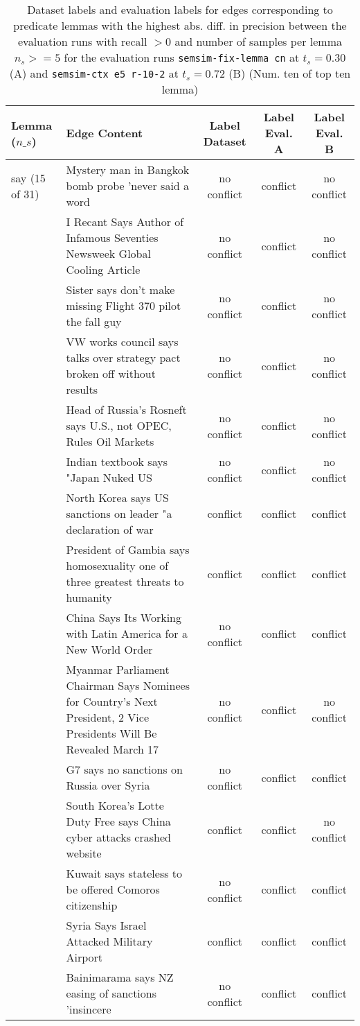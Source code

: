 \begin{sidewaystable}[ht]
\centering
\begin{tabular}{l p{13cm} ccc}
\toprule
Lemma (\(n\_s\)) & Edge Content & Label Dataset & Label Eval. A & Label Eval. B \\
\midrule
say (15 of 31)
& Mystery man in Bangkok bomb probe 'never said a word & no conflict & conflict & no conflict \\
& I Recant Says Author of Infamous Seventies Newsweek Global Cooling Article & no conflict & conflict & no conflict \\
& Sister says don't make missing Flight 370 pilot the fall guy & no conflict & conflict & no conflict \\
& VW works council says talks over strategy pact broken off without results & no conflict & conflict & no conflict \\
& Head of Russia's Rosneft says U.S., not OPEC, Rules Oil Markets & no conflict & conflict & no conflict \\
& Indian textbook says "Japan Nuked US & no conflict & conflict & no conflict \\
& North Korea says US sanctions on leader "a declaration of war & conflict & conflict & conflict \\
& President of Gambia says homosexuality one of three greatest threats to humanity & conflict & conflict & conflict \\
& China Says Its Working with Latin America for a New World Order & no conflict & conflict & conflict \\
& Myanmar Parliament Chairman Says Nominees for Country's Next President, 2 Vice Presidents Will Be Revealed March 17 & no conflict & conflict & no conflict \\
& G7 says no sanctions on Russia over Syria & no conflict & conflict & conflict \\
& South Korea's Lotte Duty Free says China cyber attacks crashed website & conflict & conflict & no conflict \\
& Kuwait says stateless to be offered Comoros citizenship & no conflict & conflict & conflict \\
& Syria Says Israel Attacked Military Airport & conflict & conflict & conflict \\
& Bainimarama says NZ easing of sanctions 'insincere & no conflict & conflict & conflict \\
\bottomrule
\end{tabular}
\caption{Dataset labels and evaluation labels for edges corresponding to predicate lemmas with the highest abs. diff. in precision between the evaluation runs with recall \(> 0\) and number of samples per lemma \(n_s >= 5\) for the evaluation runs \texttt{semsim-fix-lemma cn} at \(t_s = 0.30\) (A) and \texttt{semsim-ctx e5 r-10-2} at \(t_s = 0.72\) (B)  (Num. ten of top ten lemma)}
\label{tab:ples-labels-7}
\end{sidewaystable}


